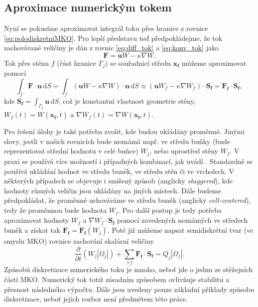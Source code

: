 \subsection{Aproximace numerickým tokem}

Nyní se pokusíme aproximovat integrál toku přes hranice z rovnice \ref{eq:polodiskretniMKO}. Pro lepší představu teď předpokládejme, že tok zachovávané veličiny je dán z rovnic \ref{eq:diff_tok} a \ref{eq:konv_tok} jako
\begin{equation*}
\mathbf{F}=\mathbf{u}W-\kappa \nabla W.
\end{equation*}
Tok přes stěnu $f$ (část hranice $\Gamma_j$) se souřadnicí středu $\mathbf{x_f}$ můžeme aproximovat pomocí
\begin{equation}\label{eq:aprox_tok}
\int_{f}\mathbf{F}\cdot \mathbf{n} \,\mathrm{d}S
=
\int_{f}(\mathbf{u}W-\kappa\nabla W)\cdot \mathbf{n}\, \mathrm{d}S 
\approx 
\left(\mathbf{u} W_f - \kappa \nabla W_f \right) \cdot \mathbf{S_f} 
= 
\mathbf{F_f} \cdot \mathbf{S_f},
\end{equation}
kde $\mathbf{S_f}=\int_{\Gamma_j}\mathbf{n}\,\mathrm{d}S$, což je konstantní vlastnost geometrie stěny, $W_f(t) = W(\mathbf{x_f},t)$ a $\nabla W_f(t) = \nabla W (\mathbf{x_f}, t)$.

Pro řešení úlohy je také potřeba zvolit, kde budou ukládány proměnné. Jinými slovy, jestli v našich rovnicích bude neznámá např. ve středu buňky (bude reprezentovat střední hodnotu v celé buňce) $W_j$, nebo uprostřed stěny $W_f$. V praxi se používá více možností i případných kombinací, jak uvádí \cite{blazek2015computational, hirsch2007numerical}.
Standardně se používá ukládání hodnot ve středu buněk, ve středu stěn či ve vrcholech.
V některých případech se objevuje i smíšený způsob (anglicky \textit{staggered}), kde hodnoty různých veličin jsou ukládány na jiných místech.
Dále budeme předpokládat, že proměnné uchováváme ve středu buněk (anglicky \textit{cell-centered}), tedy že proměnnou bude hodnota $W_j$.
Pro další postup je tedy potřeba aproximovat hodnoty $W_f$ a $\nabla W_f \cdot \mathbf{S_f}$ pomocí zavedených neznámých ve středech buněk a získat tak $ \mathbf{F_f} = \mathbf{F_f}(W_j)$.
Poté již můžeme napsat semidiskrétní tvar (ve smyslu MKO) rovnice zachování skalární veličiny 
\begin{equation*}
\frac{\partial}{\partial t} (W_j|\Omega_j|) + \sum_{\forall f} \mathbf{F_f} \cdot \mathbf{S_f} = Q_j|\Omega_j|.
\end{equation*}
Způsobů diskretizace numerického toku je mnoho, neboť jde o jednu ze stěžejních částí MKO. Numerický tok totiž zásadním způsobem ovlivňuje stabilitu a přesnost následného výpočtu. Dále jsou uvedeny pouze základní příklady způsobu diskretizace, neboť jejich rozbor není předmětem této práce.

